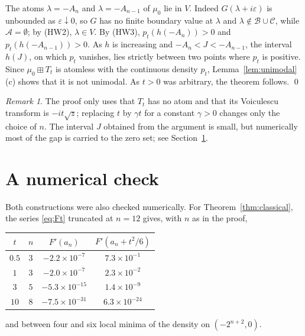 \documentclass[11pt]{amsart}
\theoremstyle{definition}
\theoremstyle{remark}
\newtheorem{remark}[theorem]{Remark}
\numberwithin{equation}{section}
\newcommand{\bp}{\boxplus}
\begin{document}
The atoms $\lambda=-A_n$ and $\lambda=-A_{n-1}$ of $\mu_0$ lie in $V$. Indeed $G(\lambda+i\varepsilon)$ is unbounded as $\varepsilon\downarrow0$, so $G$ has no finite boundary value at $\lambda$ and $\lambda\notin\mathcal B\cup\mathcal C$, while $\mathcal A=\emptyset$; by (HW2), $\lambda\in V$. By (HW3), $p_t(h(-A_n))>0$ and $p_t(h(-A_{n-1}))>0$. As $h$ is increasing and $-A_n<J<-A_{n-1}$, the interval $h(J)$, on which $p_t$ vanishes, lies strictly between two points where $p_t$ is positive. Since $\mu_0\bp T_t$ is atomless with the continuous density $p_t$, Lemma~\ref{lem:unimodal}(c) shows that it is not unimodal. As $t>0$ was arbitrary, the theorem follows. \qed

\begin{remark}
The proof only uses that $T_t$ has no atom and that its Voiculescu transform is $-it\sqrt z$; replacing $t$ by $\gamma t$ for a constant $\gamma>0$ changes only the choice of $n$. The interval $J$ obtained from the argument is small, but numerically most of the gap is carried to the zero set; see Section~\ref{sec:numerics}.
\end{remark}

\section{A numerical check}\label{sec:numerics}

Both constructions were also checked numerically. For Theorem~\ref{thm:classical}, the series \eqref{eq:Ft} truncated at $n=12$ gives, with $n$ as in the proof,
\begin{center}
\begin{tabular}{cccc}
\toprule
$t$ & $n$ & $F'(a_n)$ & $F'(a_n+t^2/6)$\\
\midrule
$0.5$ & $3$ & $-2.2\times10^{-7}$ & $7.3\times10^{-1}$\\
$1$ & $3$ & $-2.0\times10^{-7}$ & $2.3\times10^{-2}$\\
$3$ & $5$ & $-5.3\times10^{-15}$ & $1.4\times10^{-9}$\\
$10$ & $8$ & $-7.5\times10^{-31}$ & $6.3\times10^{-24}$\\
\bottomrule
\end{tabular}
\end{center}
and between four and six local minima of the density on $(-2^{n+2},0)$.
\end{document}
